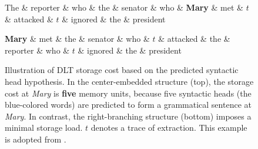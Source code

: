 \documentclass[11pt]{article}
\begin{document}
\begin{figure}[t]
    \centering
    \begin{dependency}[theme=simple, edge style={-}, arc angle=20]
        \begin{deptext}
            The \& reporter \& who \& the \& senator \& who \& \textcolor{cudOrange}{\textbf{Mary}} \& \textcolor{cudBlue}{met} \& \textcolor{cudBlue}{$t$} \& \textcolor{cudBlue}{attacked} \& \textcolor{cudBlue}{$t$} \& \textcolor{cudBlue}{ignored} \& the \& president \\
        \end{deptext}
    \end{dependency}

    \begin{dependency}[theme=simple, edge style={-}, arc angle=20]
        \begin{deptext}
            \textcolor{cudOrange}{\textbf{Mary}} \& \textcolor{cudBlue}{met} \& the \& senator \& who \& $t$ \& attacked \& the \& reporter \& who \& $t$ \& ignored \& the \& president \\
        \end{deptext}
    \end{dependency}

    \caption{Illustration of DLT storage cost based on the predicted syntactic head hypothesis.
    In the center-embedded structure (top), the storage cost at \textcolor{cudOrange}{\textit{Mary}} is \textbf{five} memory units, because five syntactic heads (the \textcolor{cudBlue}{blue}-colored words) are predicted to form a grammatical sentence at \textcolor{cudOrange}{\textit{Mary}}.
    In contrast, the right-branching structure (bottom) imposes a minimal storage load.
    $t$ denotes a trace of extraction.
    This example is adopted from \citet{chen-etal-2005}.}
    \label{fig:pred_heads}
\end{figure}
\end{document}
